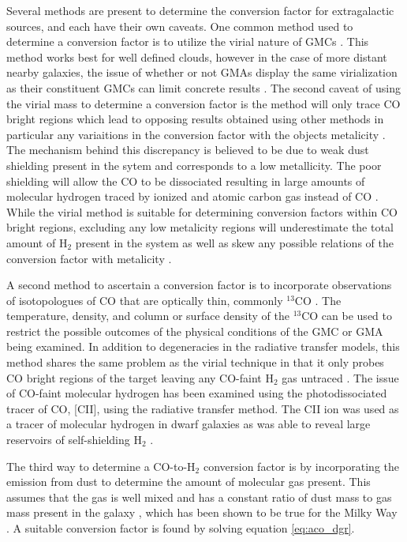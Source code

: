 Several methods are present to determine the conversion factor for extragalactic sources, and each have their own caveats.  One common method used to determine a conversion factor is to utilize the virial nature of GMCs \citep{bolatto2013}.  This method works best for well defined clouds, however in the case of more distant nearby galaxies, the issue of whether or not GMAs display the same virialization as their constituent GMCs can limit concrete results \citep{bolatto2013}.  The second caveat of using the virial mass to determine a conversion factor is the method will only trace CO bright regions which lead to opposing results obtained using other methods in particular any variaitions in the conversion factor with the objects metalicity \citep{bolatto2013}.  The mechanism behind this discrepancy is believed to be due to weak dust shielding present in the sytem and corresponds to a low metallicity.  The poor shielding will allow the CO to be dissociated resulting in large amounts of molecular hydrogen traced by ionized and atomic carbon gas instead of CO \citep{bolatto2013}.  While the virial method is suitable for determining conversion factors within CO bright regions, excluding any low metalicity regions will underestimate the total amount of H$_2$ present in the system as well as skew any possible relations of the conversion factor with metalicity \citep{bolatto2013}.

A second method to ascertain a conversion factor is to incorporate observations of isotopologues of CO that are optically thin, commonly $^{13}$CO \citep{bolatto2013}.   The temperature, density, and column or surface density of the $^{13}$CO can be used to restrict the possible outcomes of the physical conditions of the GMC or GMA being examined.  In addition to degeneracies in the radiative transfer models, this method shares the same problem as the virial technique in that it only probes CO bright regions of the target leaving any CO-faint H$_2$ gas untraced \citep{bolatto2013}.  The issue of CO-faint molecular hydrogen has been examined using the photodissociated tracer of CO, [CII], using the radiative transfer method.  The CII ion was used as a tracer of molecular hydrogen in dwarf galaxies as was able to reveal large reservoirs of self-shielding H$_2$ \citep{madden1997}.

The third way to determine a CO-to-H$_2$ conversion factor is by incorporating the emission from dust to determine the amount of molecular gas present.  This assumes that the gas is well mixed and has a constant ratio of dust mass to gas mass present in the galaxy \citep{leroy2011}, which has been shown to be true for the Milky Way \citep{boulanger1996}.  A suitable conversion factor is found by solving equation \ref{eq:aco_dgr}.

